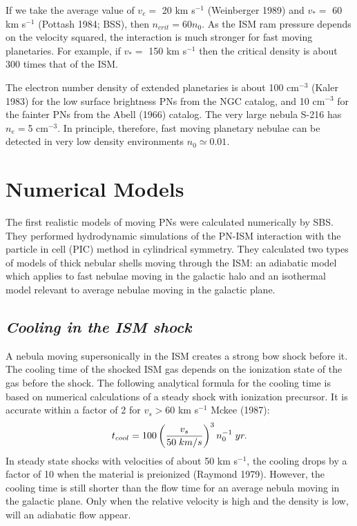 \noindent
If we take the average value of $v_{e}=$ 20 km s$^{-1}$ (Weinberger 1989)
and $v_*= $ 60 km s$^{-1}$ (Pottash 1984; BSS), then $n_{crit}=60 n_0$.
As the ISM ram pressure depends on the velocity squared,
the interaction is much stronger for fast moving planetaries.
For example, if $v_*=$ 150 km s$^{-1}$  then the critical
density is about $300$ times that of the ISM.

\noindent
The electron number density of extended planetaries is about 100 cm$^{-3}$
(Kaler 1983) for the low surface brightness PNs from the NGC catalog,
and 10 cm$^{-3}$ for the fainter PNs from the Abell (1966) catalog.
The very large nebula S-216 has $n_e=$5 cm$^{-3}$.
In principle, therefore, fast moving planetary nebulae can be detected in
very low density environments $n_{0}\simeq 0.01$.

\section{Numerical Models}
\noindent
The first realistic models of moving PNs were calculated numerically by
SBS.  They performed hydrodynamic simulations of the PN-ISM interaction
with the particle in cell (PIC) method in cylindrical symmetry. They
calculated two types of models of thick nebular shells moving through the ISM:
an adiabatic model which applies to fast nebulae moving in the
galactic halo and an isothermal model relevant to average nebulae
moving in the galactic plane.
\noindent

\subsection{\it Cooling in the ISM shock}
A nebula moving supersonically in the ISM creates a strong bow
shock before it. The cooling time of the shocked
ISM gas depends on the ionization state of the gas before
the shock. The following analytical formula for the cooling
time is based on numerical calculations of a steady shock
with ionization precursor. It is accurate within a factor
of 2 for $v_s>$60 km s$^{-1}$  Mckee (1987):
\begin{eqnarray}
t_{cool}=100 \left({v_s\over 50\; km/s}\right)^3 n_{0}^{-1}\; yr.
\end{eqnarray}
In steady state shocks with velocities of about 50 km s$^{-1}$,
the cooling drops by a factor of 10 when the material is preionized
(Raymond 1979). However, the cooling time is still shorter
than the flow time for an average nebula moving in the galactic plane.
Only when the relative velocity is high and the density is low,
will an adiabatic flow appear.

